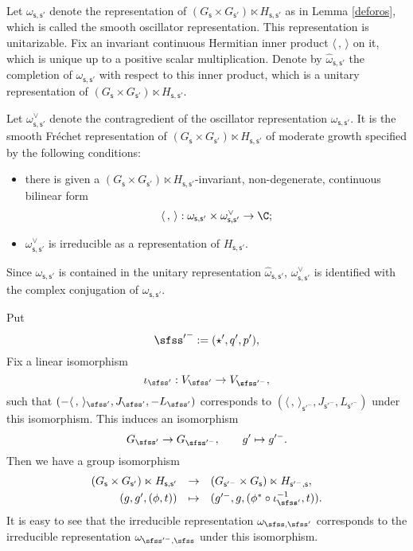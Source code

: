 \documentclass[12pt,a4paper]{amsart}
\newcommand{\la}{\langle}
\newcommand{\ra}{\rangle}
\newcommand{\be}{\begin {equation}}
\newcommand{\ee}{\end {equation}}
\numberwithin{equation}{section}
\theoremstyle{remark}
\begin{document}
Let $\omega_{\mathsf s, \mathsf s'}$ denote the representation of $(G_{\mathsf s}\times G_{\mathsf s'})\ltimes H_{\mathsf s, \mathsf s'}$ as in Lemma \ref{deforos}, which is called the smooth oscillator representation. This representation is unitarizable. Fix an invariant continuous Hermitian inner product $\la\,,\,\ra$ on it, which is unique up to a positive scalar multiplication. 
Denote by $\hat \omega_{\mathsf s, \mathsf s'}$ the completion of $\omega_{\mathsf s, \mathsf s'}$ with respect to this inner product, which is a unitary representation of  $(G_{\mathsf s}\times G_{\mathsf s'})\ltimes H_{\mathsf s, \mathsf s'}$. 

 Let $\omega_{\mathsf s, \mathsf s'}^\vee$ denote the  contragredient of the  oscillator  representation $\omega_{\mathsf s, \mathsf s'}$. It is  the smooth Fr\'echet representation of $(G_{\mathsf s}\times G_{\mathsf s'})\ltimes H_{\mathsf s, \mathsf s'}$ of moderate growth specified by the following conditions:
 \begin{itemize}
 \item there is given a  $(G_{\mathsf s}\times G_{\mathsf s'})\ltimes H_{\mathsf s, \mathsf s'}$-invariant, non-degenerate, continuous bilinear form
 \[
   \la\,,\,\ra:  \omega_{\mathsf s, \mathsf s'}\times \omega_{\mathsf s, \mathsf s'}^\vee\rightarrow \C; 
 \]
 \item  $\omega_{\mathsf s, \mathsf s'}^\vee$  is irreducible as a representation of $H_{\mathsf s, \mathsf s'}$. 
 \end{itemize}
Since $\omega_{\mathsf s, \mathsf s'}$ is contained in the unitary representation $\hat \omega_{\mathsf s, \mathsf s'}$, $\omega_{\mathsf s, \mathsf s'}^\vee$ is identified with the complex conjugation of $\omega_{\mathsf s, \mathsf s'}$. 

Put
\[%
   {\sfss'}^-:=(\star', q', p'),
\]
Fix a linear isomorphism
\be\label{iota0}
 \iota_{\sfss'}:  V_{\sfss'}\rightarrow V_{\sfss'^-}, %
\ee
such that $(-\la\,,\,\ra_{\sfss'}, J_{\sfss'},-L_{\sfss'})$ corresponds to   $(\la\,,\,\ra_{\mathsf s'^-}, J_{\mathsf s'^-}, L_{\mathsf s'^-})$ under this isomorphism.
This induces an isomorphism
\be\label{isoggp}
  G_{\sfss'}\rightarrow G_{\sfss'^-}, \qquad g'\mapsto g'^-.
\ee
Then we have a group isomorphism 
\be\label{identifyjg}
\begin{array}{rcl}
  (G_{\mathsf s}\times G_{\mathsf s'})\ltimes H_{\mathsf s, \mathsf s'}&\rightarrow& (G_{\mathsf s'^-}\times G_{\mathsf s})\ltimes H_{\mathsf s'^-, \mathsf s},\smallskip\\
   (g, g', (\phi, t))&\mapsto & (g'^-, g, (\phi^*  \circ \iota_{\sfss'}^{-1}, t)).
   \end{array}
\ee
It is easy to see that the irreducible representation $\omega_{\sfss, \sfss'}$ corresponds to the irreducible representation $\omega_{\sfss'^-, \sfss}$ under this isomorphism. 
\end{document}
